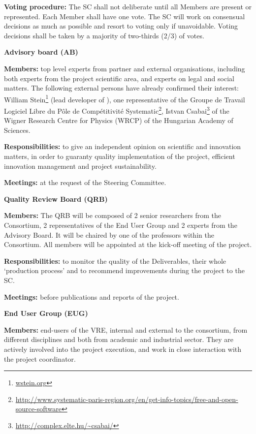 \begin{description}
\textbf{Voting procedure:} The SC shall not deliberate until all
Members are present or represented.  Each Member shall have one
vote. The SC will work on consensual decisions as much as possible and
resort to voting only if unavoidable. Voting decisions shall be taken
by a majority of two-thirds (2/3) of votes.



\item{\textbf{Advisory board (AB)}}\nobreak\par

\textbf{Members:} top level experts from partner and external
organisations, including both experts from the project scientific
area, and experts on legal and social matters. The following external
persons have already confirmed their interest: William
Stein\footnote{\url{wstein.org}} (lead developer of \SMC), one
representative of the Groupe de Travail Logiciel Libre du Pôle de
Compétitivité
Systematic\footnote{\url{http://www.systematic-paris-region.org/en/get-info-topics/free-and-open-source-software}},
Istvan Csabai\footnote{\url{http://complex.elte.hu/~csabai/}} of the
Wigner Research Centre for Physics (WRCP) of the Hungarian Academy of
Sciences.

\textbf{Responsibilities:} to give an independent opinion on
scientific and innovation matters, in order to guaranty quality
implementation of the project, efficient innovation management and
project sustainability.  

\textbf{Meetings:} at the request of the Steering Committee.


\item{\textbf{Quality Review Board (QRB)}}\nobreak\par
\textbf{Members:} The QRB will be composed of 2 senior
researchers from the Consortium, 2 representatives of the End User
Group and 2 experts from the Advisory Board. It will be chaired by one
of the professors within the Consortium. All members will be appointed
at the kick-off meeting of the project.  

\textbf{Responsibilities:}
to monitor the quality of the Deliverables, their whole ‘production
process’ and to recommend improvements during the project to the SC.

\textbf{Meetings:} before publications and reports of the
project.

\item{\textbf{End User Group (EUG)}}\nobreak\par

\textbf{Members:} end-users of the VRE, internal and external to
the consortium, from different disciplines and both from academic and
industrial sector. They are actively involved into the project
execution, and work in close interaction with the project coordinator.


\end{description}
